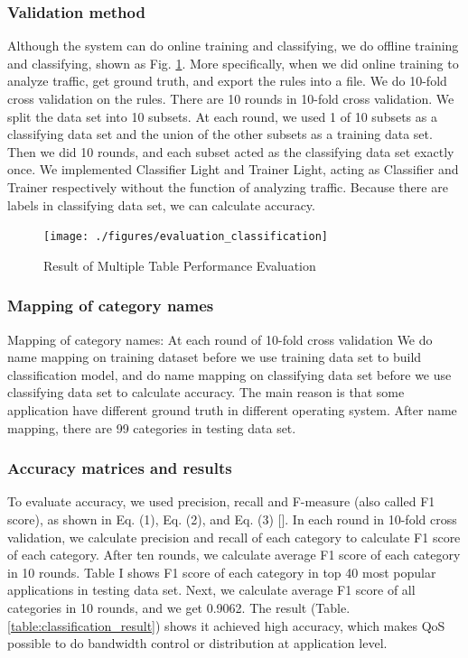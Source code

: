 \documentclass[journal]{IEEEtran}
\begin{document}
\subsubsection{Validation method}
Although the system can do online training and classifying, we do offline training and classifying, shown as Fig. \ref{fig:evaluation_classification}. More specifically, when we did online training to analyze traffic, get ground truth, and export the rules into a file. We do 10-fold cross validation on the rules. There are 10 rounds in 10-fold cross validation. We split the data set into 10 subsets. At each round, we used 1 of 10 subsets as a classifying data set and the union of the other subsets as a training data set. Then we did 10 rounds, and each subset acted as the classifying data set exactly once. We implemented Classifier Light and Trainer Light, acting as Classifier and Trainer respectively without the function of analyzing traffic. Because there are labels in classifying data set, we can calculate accuracy.

\begin{figure}[!t]
\centering
\texttt{[image: ./figures/evaluation\_classification]}
\caption{Result of Multiple Table Performance Evaluation}
\label{fig:evaluation_classification}
\end{figure}

\subsubsection{Mapping of category names}
Mapping of category names: At each round of 10-fold cross validation We do name mapping on training dataset before we use training data set to build classification model, and do name mapping on classifying data set before we use classifying data set to calculate accuracy. The main reason is that some application have different ground truth in different operating system. After name mapping, there are 99 categories in testing data set.

\subsubsection{Accuracy matrices and results}
To evaluate accuracy, we used precision, recall and F-measure (also called F1 score), as shown in Eq. (1), Eq. (2), and Eq. (3) []. In each round in 10-fold cross validation, we calculate precision and recall of each category to calculate F1 score of each category. After ten rounds, we calculate average F1 score of each category in 10 rounds. Table I shows F1 score of each category in top 40 most popular applications in testing data set. Next, we calculate average F1 score of all categories in 10 rounds, and we get 0.9062. The result (Table. \ref{table:classification_result}) shows it achieved high accuracy, which makes QoS possible to do bandwidth control or distribution at application level.
\end{document}
